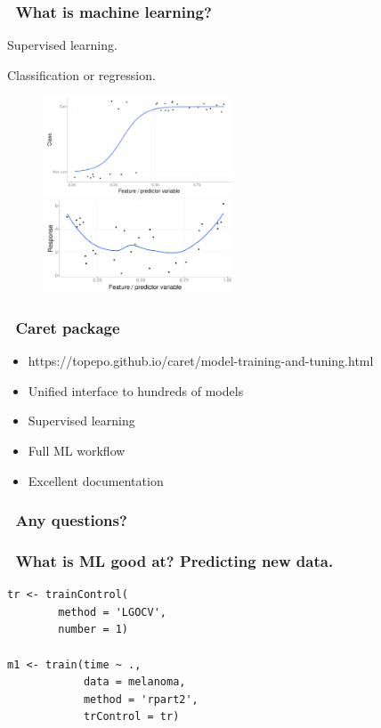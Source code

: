 \documentclass[handout, aspectratio = 169]{beamer}
\begin{document}
\begin{frame}
\frametitle{\insertframenumber~What is machine learning?}
Supervised learning.

Classification or regression.
\begin{figure}
    \includegraphics[width = 0.5\textwidth]{classification}%
    \includegraphics[width = 0.5\textwidth]{regression}
\end{figure} 

\end{frame} 


\begin{frame}
\frametitle{\insertframenumber~Caret package}
\begin{itemize}
\item https://topepo.github.io/caret/model-training-and-tuning.html
\item Unified interface to hundreds of models
\item Supervised learning
\item Full ML workflow
\item Excellent documentation
\end{itemize}

\end{frame} 



\begin{frame}
\frametitle{\insertframenumber~Any questions?}


\end{frame} 










\begin{frame}[fragile]
\frametitle{\insertframenumber~What is ML good at? Predicting new data.}
\renewcommand{\FancyVerbFormatLine}[1]{%
   \ifnum\value{FancyVerbLine}=8\color{cyan}#1%
   \else #1\fi}
\begin{Verbatim}
tr <- trainControl(
        method = 'LGOCV',
        number = 1)

m1 <- train(time ~ ., 
            data = melanoma,
            method = 'rpart2',
            trControl = tr)

\end{Verbatim}

\end{frame} 
\end{document}
